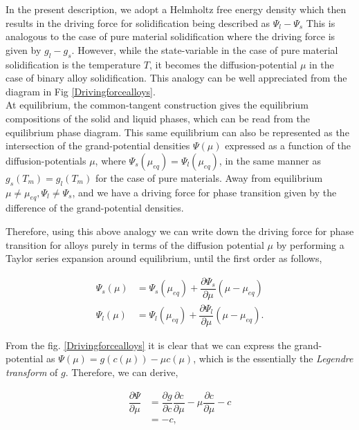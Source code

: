 \documentclass[a4paper]{report}
\begin{document}
  In the present description, we adopt a Helmholtz free energy density which then results in the driving 
  force for solidification being described as $\Psi_l-\Psi_s$ This is analogous to the case of 
  pure material solidification where the driving force is given by $g_l-g_s$.  
  However, while the state-variable in the case of pure material solidification is the temperature $T$, 
  it becomes the diffusion-potential $\mu$ in the case of binary alloy solidification. This analogy 
  can be well appreciated from the diagram in Fig \ref{Drivingforcealloys}.\\
  
  At equilibrium, the common-tangent construction gives the equilibrium 
  compositions of the solid and liquid phases, which can be read from the 
  equilibrium phase diagram. This same equilibrium can also be represented 
  as the intersection of the grand-potential densities $\Psi\left(\mu\right)$ expressed as 
  a function of the diffusion-potentials $\mu$, where $\Psi_s\left(\mu_{eq}\right)=\Psi_l
  \left(\mu_{eq}\right)$, in the same manner as $g_s(T_m)= g_l(T_m)$ for the case of pure 
  materials. Away from equilibrium  $\mu\neq\mu_{eq}, \Psi_l\neq \Psi_s$, and we have a driving 
  force for phase transition given by the difference of the grand-potential densities.
  
  Therefore, using this above analogy we can write down the driving force
  for phase transition for alloys purely in terms of the diffusion potential 
  $\mu$ by performing a Taylor series expansion around equilibrium, until the 
  first order as follows, 
  
  \begin{align}
  \Psi_s\left(\mu\right) &= \Psi_s\left(\mu_{eq}\right) + \dfrac{\partial \Psi_s}{\partial \mu}\left(\mu-\mu_{eq}\right)\\
  \Psi_l\left(\mu\right) &= \Psi_l\left(\mu_{eq}\right) + \dfrac{\partial \Psi_l}{\partial \mu}\left(\mu-\mu_{eq}\right).
  \end{align}
  
  From the fig. \ref{Drivingforcealloys} it is clear that we can express the 
  grand-potential as $\Psi(\mu) = g(c(\mu)) -\mu c\left(\mu\right)$, which is the 
  essentially the \textit{Legendre transform} of $g$. Therefore, we can derive, 
  
  \begin{align}
   \dfrac{\partial \Psi}{\partial \mu} &= \dfrac{\partial g}{\partial c}\dfrac{\partial c}{\partial \mu} - \mu \dfrac{\partial c}{\partial \mu} -c\\
                                       &= -c,
  \end{align}
  
\end{document}
